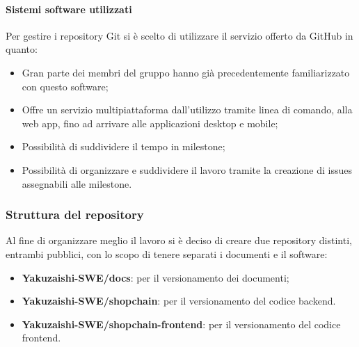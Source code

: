         \paragraph{Sistemi software utilizzati}
        Per gestire i repository\glo{} Git\glo{} si è scelto di utilizzare il servizio offerto da GitHub\glo{} in quanto:
        \begin{itemize}
            \item Gran parte dei membri del gruppo hanno già precedentemente familiarizzato con questo software;
            \item Offre un servizio multipiattaforma dall'utilizzo tramite linea di comando, alla web app, fino ad arrivare alle applicazioni desktop e mobile;
            \item Possibilità di suddividere il tempo in milestone\glo{};
            \item Possibilità di organizzare e suddividere il lavoro tramite la creazione di issues\glo{} assegnabili alle milestone\glo{}.
        \end{itemize} 


    \subsubsection{Struttura del repository}
    Al fine di organizzare meglio il lavoro si è deciso di creare due repository\glo{} distinti, entrambi pubblici, con lo scopo di tenere separati i documenti e il software:
    \begin{itemize}
        \item \textbf{Yakuzaishi-SWE/docs}: per il versionamento dei documenti;
        \item \textbf{Yakuzaishi-SWE/shopchain}: per il versionamento del codice backend\glo{}.
        \item \textbf{Yakuzaishi-SWE/shopchain-frontend\glo{}}: per il versionamento del codice frontend\glo{}.

    \end{itemize}

